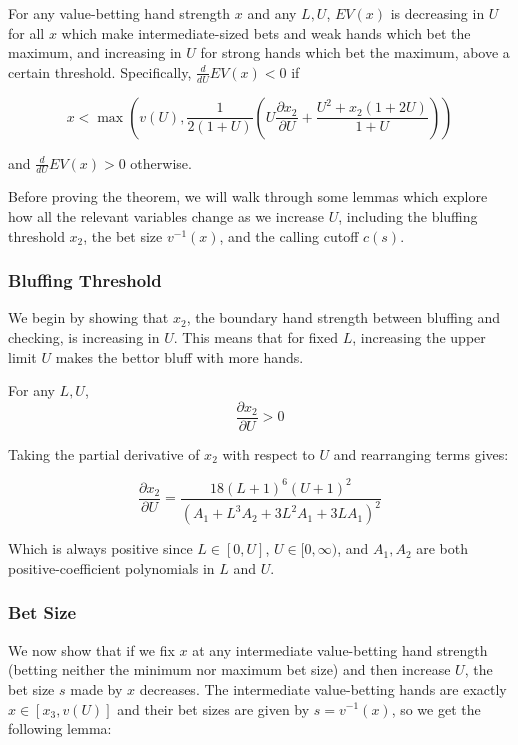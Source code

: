 \documentclass[../../main/main.tex]{subfiles}
\begin{document}
\begin{theorem}
    \label{thm:payoff_increasing}
    For any value-betting hand strength $x$ and any $L, U$, $EV(x)$ is decreasing in $U$ for all $x$ which make intermediate-sized bets and weak hands which bet the maximum, and increasing in $U$ for strong hands which bet the maximum, above a certain threshold. Specifically, $\frac{d}{dU} EV(x) < 0$ if 
    
    $$x < \max\left(v(U), \frac{1}{2(1+U)} \left( U \frac{\partial x_2}{\partial U} + \frac{U^2 + x_2(1 + 2U)}{1+U} \right) \right)$$

    and $\frac{d}{dU} EV(x) > 0$ otherwise.
\end{theorem}

Before proving the theorem, we will walk through some lemmas which explore how all the relevant variables change as we increase $U$, including the bluffing threshold $x_2$, the bet size $v^{-1}(x)$, and the calling cutoff $c(s)$.

\subsubsection{Bluffing Threshold}

We begin by showing that $x_2$, the boundary hand strength between bluffing and checking, is increasing in $U$. This means that for fixed $L$, increasing the upper limit $U$ makes the bettor bluff with more hands. 

\begin{lemma}
    \label{lem:x2_increasing}
    For any $L, U$,
    $$ \frac{\partial x_2}{\partial U} > 0 $$
\end{lemma}

\begin{customproof}
    Taking the partial derivative of $x_2$ with respect to $U$ and rearranging terms gives:
    
    $$\frac{\partial x_2}{\partial U} = \frac{18 (L+1)^6 (U+1)^2}{\left(A_1 + L^3 A_2 + 3 L^2 A_1 + 3 L A_1 \right)^2}$$

    Which is always positive since $L \in [0, U]$, $U \in [0, \infty)$, and $A_1, A_2$ are both positive-coefficient polynomials in $L$ and $U$.   
\end{customproof}

\subsubsection{Bet Size}

We now show that if we fix $x$ at any intermediate value-betting hand strength (betting neither the minimum nor maximum bet size) and then increase $U$, the bet size $s$ made by $x$ decreases. The intermediate value-betting hands are exactly $x \in [x_3, v(U)]$ and their bet sizes are given by $s = v^{-1}(x)$, so we get the following lemma:
\end{document}
